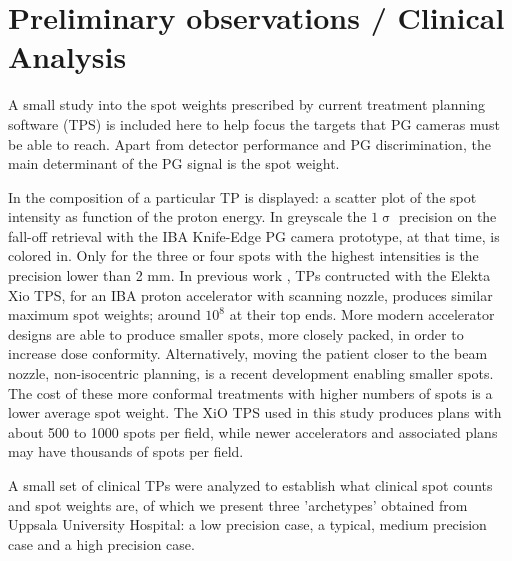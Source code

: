 \documentclass[a4paper,english]{article}
\begin{document}
\section{Preliminary observations / Clinical Analysis}\label{sec:tpanalysis}

A small study into the spot weights prescribed by current treatment planning software (TPS) is included here to help focus the targets that PG cameras must be able to reach. Apart from detector performance and PG discrimination, the main determinant of the PG signal is the spot weight.

In \cite{Smeets2012} the composition of a particular TP is displayed: a scatter plot of the spot intensity as function of the proton energy. In greyscale the $1\upsigma$ precision on the fall-off retrieval with the IBA Knife-Edge PG camera prototype, at that time, is colored in. Only for the three or four spots with the highest intensities is the precision lower than 2 mm. In previous work \citep{Grevillot2011}, TPs contructed with the Elekta Xio TPS, for an IBA proton accelerator with scanning nozzle, produces similar maximum spot weights; around $10^8$ at their top ends. More modern accelerator designs are able to produce smaller spots, more closely packed, in order to increase dose conformity. Alternatively, moving the patient closer to the beam nozzle, non-isocentric planning, is a recent development \cite{Grevillot2015} enabling smaller spots. The cost of these more conformal treatments with higher numbers of spots is a lower average spot weight. The XiO TPS used in this study produces plans with about 500 to 1000 spots per field, while newer accelerators and associated plans may have thousands of spots per field.

A small set of clinical TPs were analyzed to establish what clinical spot counts and spot weights are, of which we present three 'archetypes' obtained from Uppsala University Hospital: a low precision case, a typical, medium precision case and a high precision case.
\end{document}
